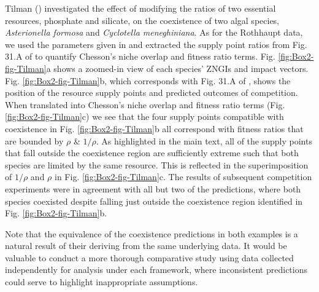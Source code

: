 \begin{infobox}
Tilman (\citeyear{Tilman1977, tilman1982}) investigated the effect of modifying the ratios of two essential resources, phosphate and silicate, on the coexistence of two algal species, \textit{Asterionella formosa} and \textit{Cyclotella meneghiniana}. As for the Rothhaupt data, we used the parameters given in \cite{Tilman1977} and extracted the supply point ratios from Fig. 31.A of \citet{tilman1982} to quantify Chesson's niche overlap and fitness ratio terms. Fig. \ref{fig:Box2-fig-Tilman}a shows a zoomed-in view of each species' ZNGIs and impact vectors. Fig. \ref{fig:Box2-fig-Tilman}b, which corresponds with Fig. 31.A of \citet{tilman1982}, shows the position of the resource supply points and predicted outcomes of competition. When translated into Chesson's niche overlap and fitness ratio terms (Fig. \ref{fig:Box2-fig-Tilman}c) we see that the four supply points compatible with coexistence in Fig. \ref{fig:Box2-fig-Tilman}b all correspond with fitness ratios that are bounded by $\rho$ \& $1/\rho$. As highlighted in the main text, all of the supply points that fall outside the coexistence region are sufficiently extreme such that both species are limited by the same resource. This is reflected in the superimposition of $1/\rho$ and $\rho$ in Fig. \ref{fig:Box2-fig-Tilman}c. The results of subsequent competition experiments were in agreement with all but two of the predictions, where both species coexisted despite falling just outside the coexistence region identified in Fig. \ref{fig:Box2-fig-Tilman}b.
\par


Note that the equivalence of the coexistence predictions in both examples is a natural result of their deriving from the same underlying data. It would be valuable to conduct a more thorough comparative study using data collected independently for analysis under each framework, where inconsistent predictions could serve to highlight inappropriate assumptions.
\end{infobox}
